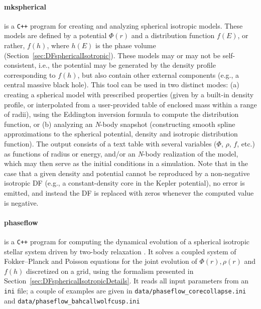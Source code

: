 \documentclass[12pt]{article}
\newcommand{\Nbody}{\textsl{N}-body\xspace}
\newcommand{\Cpp}  {\texttt{C++}\xspace}
\let\oldparagraph\paragraph
\renewcommand{\paragraph}[1]{\vspace{-2mm}\oldparagraph{#1}}
\begin{document}
\label{sec:mkspherical}%
\paragraph{mkspherical} is a \Cpp program for creating and analyzing spherical isotropic models. These models are defined by a potential $\Phi(r)$ and a distribution function $f(E)$, or rather, $f(h)$, where $h(E)$ is the phase volume (Section~\ref{sec:DFsphericalIsotropic}). These models may or may not be self-consistent, i.e., the potential may be generated by the density profile corresponding to $f(h)$, but also contain other external components (e.g., a central massive black hole). This tool can be used in two distinct modes: (a) creating a spherical model with prescribed properties (given by a built-in density profile, or interpolated from a user-provided table of enclosed mass within a range of radii), using the Eddington inversion formula to compute the distribution function, or (b) analyzing an \Nbody snapshot (constructing smooth spline approximations to the spherical potential, density and isotropic distribution function). The output consists of a text table with several variables ($\Phi$, $\rho$, $f$, etc.) as functions of radius or energy, and/or an \Nbody realization of the model, which may then serve as the initial conditions in a simulation. Note that in the case that a given density and potential cannot be reproduced by a non-negative isotropic DF (e.g., a constant-density core in the Kepler potential), no error is emitted, and instead the DF is replaced with zeros whenever the computed value is negative.

\paragraph{phaseflow} is a \Cpp program for computing the dynamical evolution of a spherical isotropic stellar system driven by two-body relaxation \cite{Vasiliev2017}. It solves a coupled system of Fokker--Planck and Poisson equations for the joint evolution of $\Phi(r), \rho(r)$ and $f(h)$ discretized on a grid, using the formalism presented in Section~\ref{sec:DFsphericalIsotropicDetails}. It reads all input parameters from an \texttt{ini} file; a couple of examples are given in \texttt{data/phaseflow_corecollapse.ini} and \texttt{data/phaseflow_bahcallwolfcusp.ini}

\label{sec:raga}%
\end{document}
